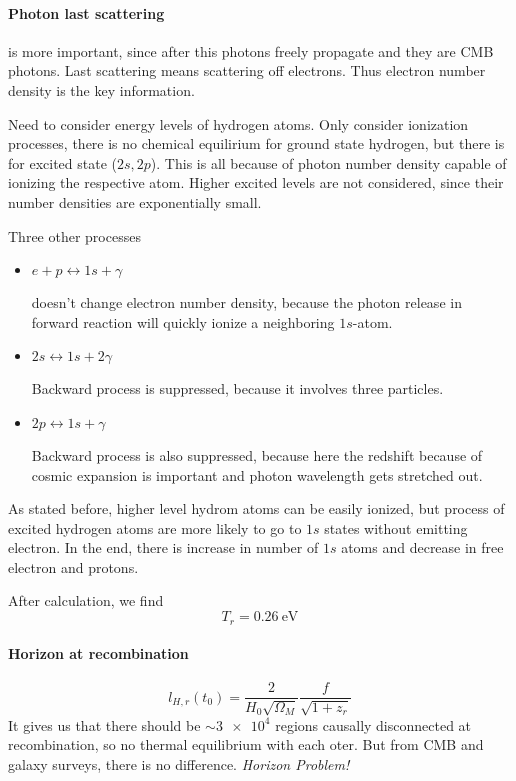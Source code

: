 \documentclass[12pt, a4paper, DIV=15]{article}
\numberwithin{equation}{section}
\begin{document}
\paragraph{Photon last scattering} is more important, since after this photons freely propagate and they are CMB photons. Last scattering means scattering off electrons. Thus electron number density is the key information.

Need to consider energy levels of hydrogen atoms. Only consider ionization processes, there is no chemical equilirium for ground state hydrogen, but there is for excited state ($2s, 2p$). This is all because of photon number density capable of ionizing the respective atom. Higher excited levels are not considered, since their number densities are exponentially small.

Three other processes
\begin{itemize}
   \item $e+ p \leftrightarrow 1s + \gamma$ 
     
      doesn't change electron number density, because the photon release in forward reaction will quickly ionize a neighboring $1s$-atom.
   \item $2s \leftrightarrow 1s + 2\gamma$

      Backward process is suppressed, because it involves three particles.

   \item $2p \leftrightarrow 1s + \gamma$

      Backward process is also suppressed, because here the redshift because of cosmic expansion is important and photon wavelength gets stretched out.
\end{itemize}

As stated before, higher level hydrom atoms can be easily ionized, but process of excited hydrogen atoms are more likely to go to $1s$ states without emitting electron. In the end, there is increase in number of $1s$ atoms and decrease in free electron and protons.

After calculation, we find
\begin{equation}
   T_r = \SI{0.26}{\eV}
\end{equation}

\paragraph{Horizon at recombination}
\begin{equation}
   l_{H,r}(t_0) = \frac{2}{H_0 \sqrt{\Omega_M}} \frac{f}{\sqrt{1+z_r}}
\end{equation}
It gives us that there should be $\sim \num{3e4}$ regions causally disconnected at recombination, so no thermal equilibrium with each oter. But from CMB and galaxy surveys, there is no difference. \textit{Horizon Problem!}
\end{document}
